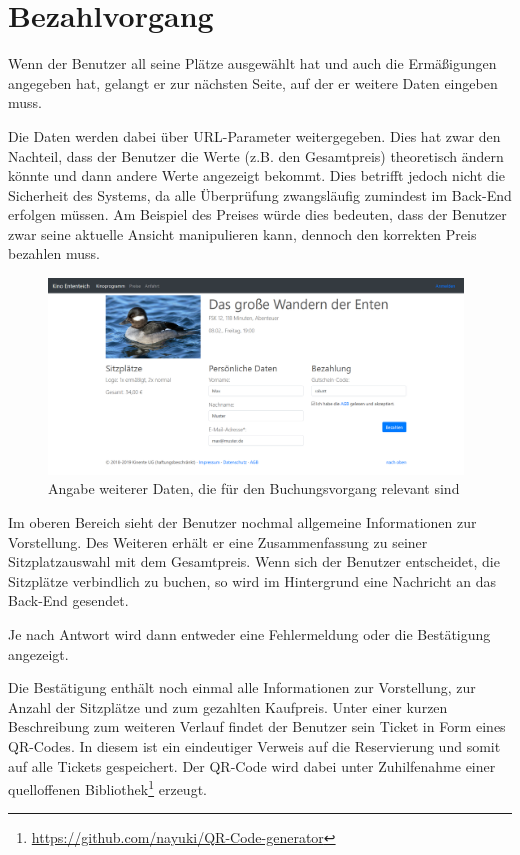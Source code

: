 \section{Bezahlvorgang}
\authorsection{\authorNL}

Wenn der Benutzer all seine Plätze ausgewählt hat und auch die Ermäßigungen angegeben hat, gelangt er zur nächsten Seite, auf der er weitere Daten eingeben muss.

Die Daten werden dabei über \acs{URL}-Parameter weitergegeben.
Dies hat zwar den Nachteil, dass der Benutzer die Werte (z.B. den Gesamtpreis) theoretisch ändern könnte und dann andere Werte angezeigt bekommt.
Dies betrifft jedoch nicht die Sicherheit des Systems, da alle Überprüfung zwangsläufig zumindest im Back-End erfolgen müssen.
Am Beispiel des Preises würde dies bedeuten, dass der Benutzer zwar seine aktuelle Ansicht manipulieren kann, dennoch den korrekten Preis bezahlen muss.

\begin{figure}[ht]
	\centering
	\includegraphics[width=0.98\textwidth]{img/screenshots/vorstellung03}
	\captionsetup{format=hang}
	\caption{Angabe weiterer Daten, die für den Buchungsvorgang relevant sind}
	\label{fig:vorstellung03}
\end{figure}

Im oberen Bereich sieht der Benutzer nochmal allgemeine Informationen zur Vorstellung.
Des Weiteren erhält er eine Zusammenfassung zu seiner Sitzplatzauswahl mit dem Gesamtpreis.
Wenn sich der Benutzer entscheidet, die Sitzplätze verbindlich zu buchen, so wird im Hintergrund eine Nachricht an das Back-End gesendet.

Je nach Antwort wird dann entweder eine Fehlermeldung oder die Bestätigung angezeigt.

Die Bestätigung enthält noch einmal alle Informationen zur Vorstellung, zur Anzahl der Sitzplätze und zum gezahlten Kaufpreis.
Unter einer kurzen Beschreibung zum weiteren Verlauf findet der Benutzer sein Ticket in Form eines \acs{QR-Code}s.
In diesem ist ein eindeutiger Verweis auf die Reservierung und somit auf alle Tickets gespeichert.
Der \acs{QR-Code} wird dabei unter Zuhilfenahme einer quelloffenen Bibliothek\footnote{\url{https://github.com/nayuki/QR-Code-generator}} erzeugt.

